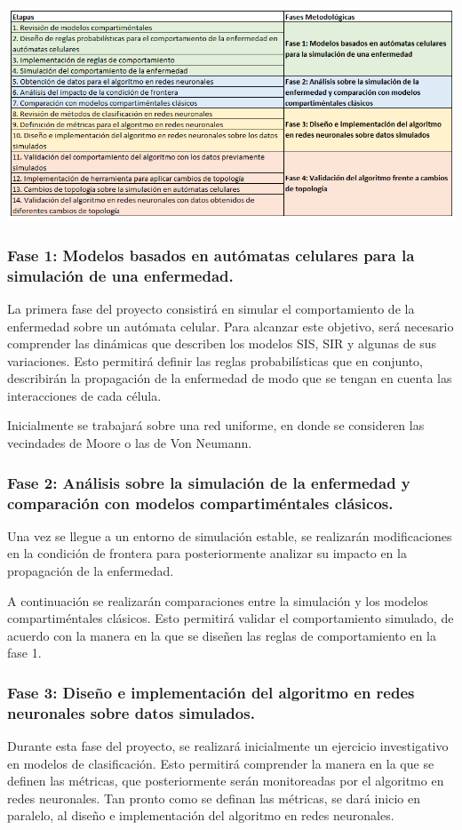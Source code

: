 \begin{center}
	\includegraphics[width=1\linewidth]{Imagenes/fasesMetodologicas.PNG}
\end{center}

\subsubsection*{Fase 1: Modelos basados en autómatas celulares para la simulación de una enfermedad.}
La primera fase del proyecto consistirá en simular el comportamiento de la enfermedad sobre un autómata celular. Para alcanzar este objetivo, será necesario comprender las dinámicas que describen los modelos SIS, SIR y algunas de sus variaciones. Esto permitirá definir las reglas probabilísticas que en conjunto, describirán la propagación de la enfermedad de modo que se tengan en cuenta las interacciones de cada célula.

Inicialmente se trabajará sobre una red uniforme, en donde se consideren las vecindades de Moore o las de Von Neumann.

\subsubsection*{Fase 2: Análisis sobre la simulación de la enfermedad y comparación con modelos compartiméntales clásicos.}
Una vez se llegue a un entorno de simulación estable, se realizarán modificaciones en la condición de frontera para posteriormente analizar su impacto en la propagación de la enfermedad.

A continuación se realizarán comparaciones entre la simulación y los modelos compartiméntales clásicos. Esto permitirá validar el comportamiento simulado, de acuerdo con la manera en la que se diseñen las reglas de comportamiento en la fase 1.

\subsubsection*{Fase 3: Diseño e implementación del algoritmo en redes neuronales sobre datos simulados.}
Durante esta fase del proyecto, se realizará inicialmente un ejercicio investigativo en modelos de clasificación. Esto permitirá comprender la manera en la que se definen las métricas, que posteriormente serán monitoreadas por el algoritmo en redes neuronales.
Tan pronto como se definan las métricas, se dará inicio en paralelo, al diseño e implementación del algoritmo en redes neuronales.


